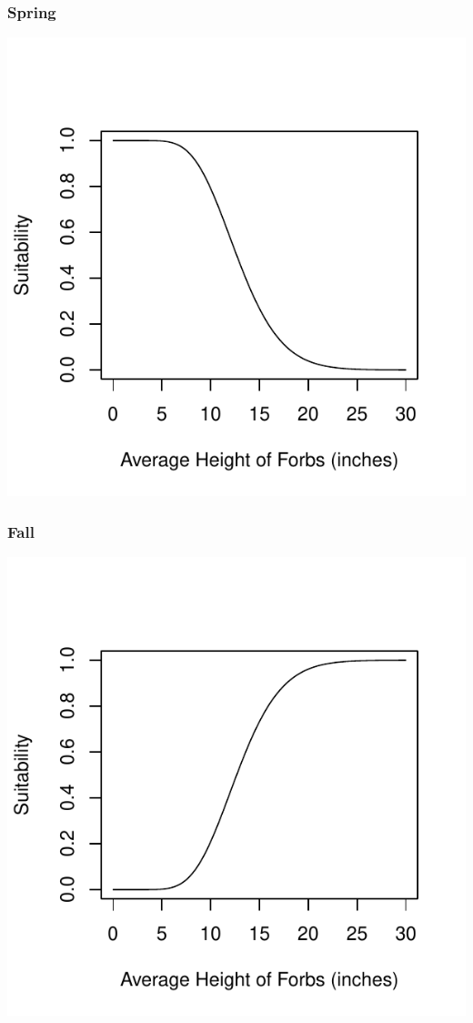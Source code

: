 \documentclass[12pt,letterpaper]{article}\usepackage{graphicx, color}
\makeatletter
\def\maxwidth{ %
  \ifdim\Gin@nat@width>\linewidth
    \linewidth
  \else
    \Gin@nat@width
  \fi
}
\newenvironment{knitrout}{}{} %
\makeatother
\begin{document}
\subsubsection{Spring}
\begin{knitrout}
\color{fgcolor}\includegraphics[width=\maxwidth]{figure/Sally-Dan_Forb_Height_spring} 
\end{knitrout}

\subsubsection{Fall}
\begin{knitrout}
\color{fgcolor}\includegraphics[width=\maxwidth]{figure/Sally-Dan_Forb_Height_fall} 
\end{knitrout}
\end{document}
